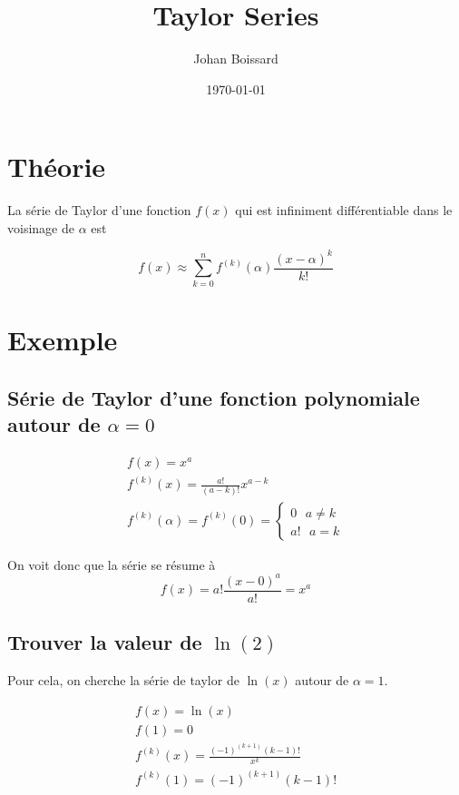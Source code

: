 \documentclass[a4paper] {scrartcl}
\author{Johan Boissard}
\date{\today}
\title{Taylor Series}
\begin{document}
\maketitle

\section{Théorie}
La série de Taylor d'une fonction $f(x)$ qui est infiniment différentiable dans le voisinage de $\alpha$ est

\begin{equation}
	f(x)\approx \sum_{k=0}^n f^{(k)}(\alpha)\frac{(x-\alpha)^k}{k!}
\end{equation}


\section{Exemple}
\subsection{Série de Taylor d'une fonction polynomiale autour de $\alpha=0$}
\begin{eqnarray*}
	f(x) = x^a\\
	f^{(k)}(x) = \frac{a!}{(a-k)!}x^{a-k}\\
	f^{(k)}(\alpha)=f^{(k)}(0) = 
	\begin{cases}
			0 \text{  }a\neq k\\
			a! \text{  }a=k
	\end{cases}
\end{eqnarray*}

On voit donc que la série se résume à 
\begin{equation}
	f(x) = a!\frac{(x-0)^a}{a!}=x^a
\end{equation}

\subsection{Trouver la valeur de $\ln{(2)}$}
Pour cela, on cherche la série de taylor de $\ln{(x)}$ autour de $\alpha=1$.

\begin{eqnarray}
	f(x) = \ln{(x)}\\
	f(1) = 0\\
	f^{(k)}(x) = \frac{(-1)^{(k+1)}(k-1)!}{x^k}\\
	f^{(k)}(1) = (-1)^{(k+1)}(k-1)!
\end{eqnarray}
\end{document}
